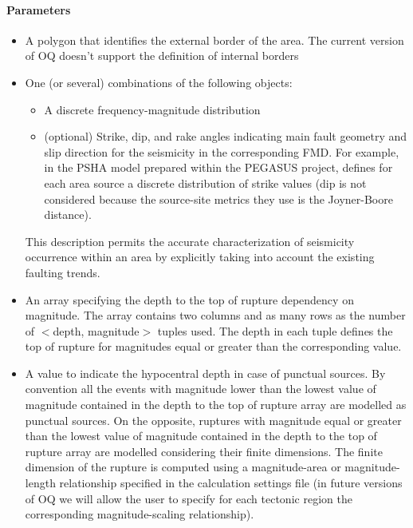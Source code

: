 \paragraph{Parameters}
\begin{itemize}
\item A polygon that identifies the external border of the area. 
The current version of OQ doesn't support the definition 
of internal borders
\item One (or several) combinations of the following objects:
\begin{itemize}
	\item A discrete frequency-magnitude distribution 
	\item (optional) Strike, dip, and rake angles indicating 
	main fault geometry and slip direction for the seismicity  
	in the corresponding FMD.
	For example, in the PSHA model prepared within the PEGASUS project,
	\cite{coppersmith2009} defines for each area source a discrete 
	distribution of strike values (dip is not considered because the 
	source-site metrics they use is the Joyner-Boore distance). 
\end{itemize}
%
This description permits the accurate characterization of seismicity 
occurrence within an area by explicitly taking into account the existing 
faulting trends. 
%
\item An array specifying the depth to the top of rupture dependency on 
magnitude. The array contains two columns and as many rows as the 
number of $<$depth, magnitude$>$ tuples used. 
The depth in each tuple defines the top of rupture for magnitudes equal 
or greater than the corresponding value. 
%
\item A value to indicate the hypocentral depth in case of punctual sources. 
By convention all the events with magnitude lower than the lowest value of 
magnitude contained in the depth to the top of rupture array are modelled as 
punctual sources. 
%
On the opposite, ruptures with magnitude equal or greater than 
the lowest value of magnitude contained in the depth to the top of rupture array 
are modelled considering their finite dimensions. The finite dimension of the 
rupture is computed using a magnitude-area or magnitude-length relationship 
specified in the calculation settings file (in future versions of OQ we will 
allow the user to specify for each tectonic region the corresponding 
magnitude-scaling relationship).
\end{itemize}
%
